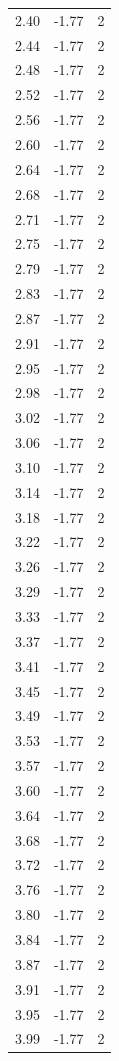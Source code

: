 \begin{longtable}{lrr}
  2.40 & -1.77 & 2 \\
  2.44 & -1.77 & 2 \\
  2.48 & -1.77 & 2 \\
  2.52 & -1.77 & 2 \\
  2.56 & -1.77 & 2 \\
  2.60 & -1.77 & 2 \\
  2.64 & -1.77 & 2 \\
  2.68 & -1.77 & 2 \\
  2.71 & -1.77 & 2 \\
  2.75 & -1.77 & 2 \\
  2.79 & -1.77 & 2 \\
  2.83 & -1.77 & 2 \\
  2.87 & -1.77 & 2 \\
  2.91 & -1.77 & 2 \\
  2.95 & -1.77 & 2 \\
  2.98 & -1.77 & 2 \\
  3.02 & -1.77 & 2 \\
  3.06 & -1.77 & 2 \\
  3.10 & -1.77 & 2 \\
  3.14 & -1.77 & 2 \\
  3.18 & -1.77 & 2 \\
  3.22 & -1.77 & 2 \\
  3.26 & -1.77 & 2 \\
  3.29 & -1.77 & 2 \\
  3.33 & -1.77 & 2 \\
  3.37 & -1.77 & 2 \\
  3.41 & -1.77 & 2 \\
  3.45 & -1.77 & 2 \\
  3.49 & -1.77 & 2 \\
  3.53 & -1.77 & 2 \\
  3.57 & -1.77 & 2 \\
  3.60 & -1.77 & 2 \\
  3.64 & -1.77 & 2 \\
  3.68 & -1.77 & 2 \\
  3.72 & -1.77 & 2 \\
  3.76 & -1.77 & 2 \\
  3.80 & -1.77 & 2 \\
  3.84 & -1.77 & 2 \\
  3.87 & -1.77 & 2 \\
  3.91 & -1.77 & 2 \\
  3.95 & -1.77 & 2 \\
  3.99 & -1.77 & 2 \\

\end{longtable}

